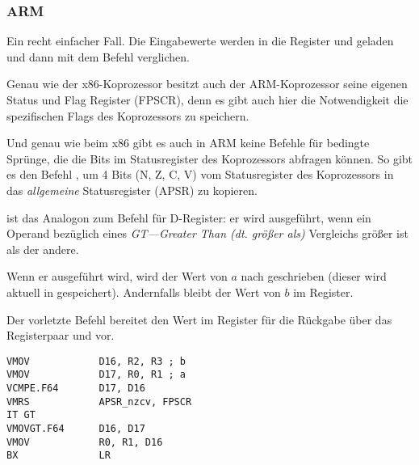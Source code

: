 \subsubsection{ARM}

\myparagraph{\OptimizingXcodeIV (\ARMMode)}



Ein recht einfacher Fall.
Die Eingabewerte werden in die Register  und  geladen und dann mit dem Befehl  verglichen. 

Genau wie der x86-Koprozessor besitzt auch der ARM-Koprozessor seine eigenen Status und Flag Register (\ac{FPSCR}), denn
es gibt auch hier die Notwendigkeit die spezifischen Flags des Koprozessors zu speichern.

Und genau wie beim x86 gibt es auch in ARM keine Befehle für bedingte Sprünge, die die Bits im Statusregister des
Koprozessors abfragen können. So gibt es den Befehl , um 4 Bits (N, Z, C, V) vom Statusregister des
Koprozessors in das \emph{allgemeine} Statusregister (\ac{APSR}) zu kopieren.

 ist das Analogon zum  Befehl für D-Register: er wird ausgeführt, wenn ein Operand bezüglich
eines \emph{GT---Greater Than (dt. größer als)} Vergleichs größer ist als der andere.

Wenn er ausgeführt wird, wird der Wert von $a$ nach  geschrieben (dieser wird aktuell in 
gespeichert). Andernfalls bleibt der Wert von $b$ im  Register.

Der vorletzte Befehl  bereitet den Wert im  Register für die Rückgabe über das Registerpaar 
und  vor.

\myparagraph{\OptimizingXcodeIV (\ThumbTwoMode)}

\begin{lstlisting}[caption=\OptimizingXcodeIV (\ThumbTwoMode),style=customasmARM]
VMOV            D16, R2, R3 ; b
VMOV            D17, R0, R1 ; a
VCMPE.F64       D17, D16
VMRS            APSR_nzcv, FPSCR
IT GT 
VMOVGT.F64      D16, D17
VMOV            R0, R1, D16
BX              LR
\end{lstlisting}

